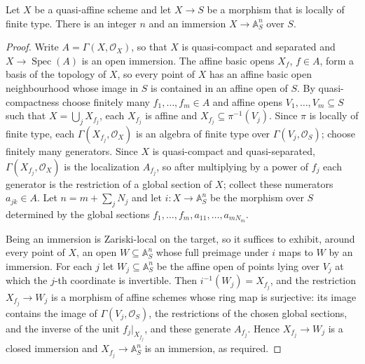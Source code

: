 \begin{lemma}
  \label{lemma:nagata-quasi-affine-immersion-affine-space-exists}
  \leanok

  Let $X$ be a quasi-affine scheme and let $X\to S$ be a morphism that is
  locally of finite type.  There is an integer $n$ and an immersion
  $X\to\mathbb A^n_S$ over $S$.
\end{lemma}

\begin{proof}
  \leanok
  Write $A=\Gamma(X,\mathcal O_X)$, so that $X$ is quasi-compact and
  separated and $X\to\operatorname{Spec}(A)$ is an open immersion.  The
  affine basic opens $X_f$, $f\in A$, form a basis of the topology of $X$,
  so every point of $X$ has an affine basic open neighbourhood whose image
  in $S$ is contained in an affine open of $S$.  By quasi-compactness choose
  finitely many $f_1,\ldots,f_m\in A$ and affine opens
  $V_1,\ldots,V_m\subseteq S$ such that $X=\bigcup_jX_{f_j}$, each
  $X_{f_j}$ is affine and $X_{f_j}\subseteq\pi^{-1}(V_j)$.  Since $\pi$ is
  locally of finite type, each $\Gamma(X_{f_j},\mathcal O_X)$ is an algebra
  of finite type over $\Gamma(V_j,\mathcal O_S)$; choose finitely many
  generators.  Since $X$ is quasi-compact and quasi-separated,
  $\Gamma(X_{f_j},\mathcal O_X)$ is the localization $A_{f_j}$, so after
  multiplying by a power of $f_j$ each generator is the restriction of a
  global section of $X$; collect these numerators $a_{jk}\in A$.  Let
  $n=m+\sum_jN_j$ and let $i\colon X\to\mathbb A^n_S$ be the morphism over
  $S$ determined by the global sections
  $f_1,\ldots,f_m,a_{11},\ldots,a_{mN_m}$.

  Being an immersion is Zariski-local on the target, so it suffices to
  exhibit, around every point of $X$, an open $W\subseteq\mathbb A^n_S$
  whose full preimage under $i$ maps to $W$ by an immersion.  For each $j$
  let $W_j\subseteq\mathbb A^n_S$ be the affine open of points lying over
  $V_j$ at which the $j$-th coordinate is invertible.  Then
  $i^{-1}(W_j)=X_{f_j}$, and the restriction $X_{f_j}\to W_j$ is a morphism
  of affine schemes whose ring map is surjective: its image contains the
  image of $\Gamma(V_j,\mathcal O_S)$, the restrictions of the chosen global
  sections, and the inverse of the unit $f_j|_{X_{f_j}}$, and these generate
  $A_{f_j}$.  Hence $X_{f_j}\to W_j$ is a closed immersion and
  $X_{f_j}\to\mathbb A^n_S$ is an immersion, as required.
\end{proof}

